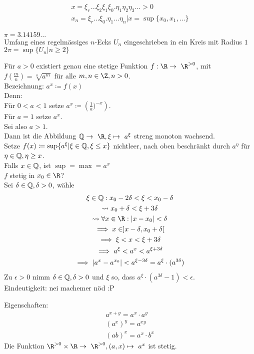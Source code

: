 \begin{bsp*}
	\begin{gather*}
		x = \xi_r \dots \xi_2 \xi_1 \xi_0 . \eta_1 \eta_2 \eta_3 \dots >0 \\
		x_n = \xi_r \dots \xi_0 . \eta_1 \dots \eta_n | x = \sup\{ x_0 , x_1 , \dotsc \}
	\end{gather*}
\end{bsp*}
\begin{bsp*}
	$\pi = 3.14159\dots$\\
	Umfang eines regelmässiges $n$-Ecks $U_n$ eingeschrieben in ein Kreis mit Radius $1$ \\
	$2\pi = \sup\{ U_n | n \geq 2 \}$
\end{bsp*}
\begin{satz*}
	Für $a > 0$ existiert genau eine stetige Funktion $f: \R \rightarrow \R^{> 0}$, mit $f\left( \frac{m}{n} \right) = \sqrt[n]{a^m}$ für alle $m, n \in \Z, n > 0$.\\
	Bezeichnung: $a^x \coloneqq f(x)$\\
	Denn:\\
	Für $0 < a < 1$ setze $a^x \coloneqq \left( \frac{1}{a} )^{-x} \right)$. \\
	Für $a =1$ setze $a^x$. \\
	Sei also $a > 1$. \\
	Dann ist die Abbildung $\Q \rightarrow \R, \xi \mapsto a^\xi$ streng monoton wachsend.\\
	Setze $f(x) \coloneqq \sup\{ a^\xi | \xi \in \mathbb{Q} , \xi \leq x \}$ nichtleer, nach oben beschränkt durch $a^\eta$ für $\eta \in \mathbb{Q} , \eta \geq x$.\\
	Falls $x \in \mathbb{Q}$, ist $\sup = \max = a^x$\\
	$f$ stetig in $x_0 \in \R$? \\
	Sei $\delta \in \mathbb{Q} , \delta > 0$, wähle \\
	\begin{gather*}
		\xi \in \Q : x_0 - 2\delta < \xi < x_0 - \delta \\
		\rightsquigarrow x_0 + \delta < \xi + 3\delta \\
		\rightsquigarrow \forall x \in \R : \abs{x-x_0} < \delta \\
		\implies x \in ] x - \delta , x_0 + \delta [ \\
		\implies \xi < x < \xi + 3\delta \\
		\implies a^\xi < a^x < a^{\xi + 3\delta} \\
		\implies \abs{ a^x - a^{x_0} } < a^{\xi - 3\delta} = a^\xi \cdot ( a^{3\delta } )
	\end{gather*}
	Zu $\epsilon > 0$ nimm $\delta \in \mathbb{Q}, \delta > 0$ und $\xi$ so, dass $a^\xi \cdot ( a^{3\delta} - 1 ) < \epsilon$.\\
	Eindeutigkeit: \dotfill nei machemer nöd :P
	
	Eigenschaften:
	\begin{gather*}
		a^{x+y} = a^x \cdot a^y \\
		(a^x)^y = a^{xy} \\
		(ab)^x = a^x \cdot b^x
	\end{gather*}
	Die Funktion $\R^{> 0} \times \R \rightarrow \R^{>0} , (a,x) \mapsto a^x$ ist stetig.
\end{satz*}
